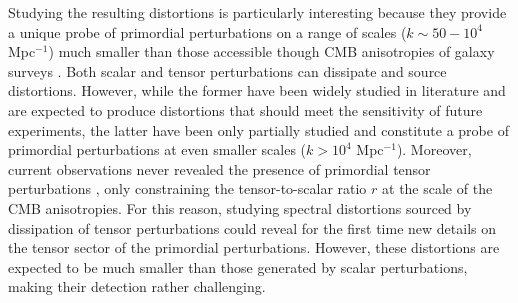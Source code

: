 Studying the resulting distortions is particularly interesting because they provide a unique probe of primordial perturbations on a range of scales ($k\sim50-10^{4}$ Mpc$^{-1}$) much smaller than those accessible though CMB anisotropies of galaxy surveys \cite{chlubafuturestepscosmologyusing}. Both scalar and tensor perturbations can dissipate and source distortions. However, while the former have been widely studied in literature \cite{Lucca_2020,Chluba_2x2} and are expected to produce distortions that should meet the sensitivity of future experiments, the latter have been only partially studied \cite{Chluba_tens_diss} and constitute a probe of primordial perturbations at even smaller scales ($k>10^{4}$ Mpc$^{-1}$). Moreover, current observations never revealed the presence of primordial tensor perturbations \cite{Ade_2021,planck2018results}, only constraining the tensor-to-scalar ratio $r$ at the scale of the CMB anisotropies. For this reason, studying spectral distortions sourced by dissipation of tensor perturbations could reveal for the first time new details on the tensor sector of the primordial perturbations. However, these distortions are expected to be much smaller than those generated by scalar perturbations, making their detection rather challenging. 

